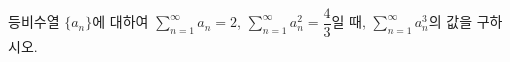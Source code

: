 등비수열 $\{a_n\}$에 대하여 $\displaystyle\sum_{n=1}^{\infty}a_n=2$, $\displaystyle\sum_{n=1}^{\infty}a_n^{2}=\dfrac{4}{3}$일 때, $\displaystyle\sum_{n=1}^{\infty}a_n^{3}$의 값을 구하시오.
